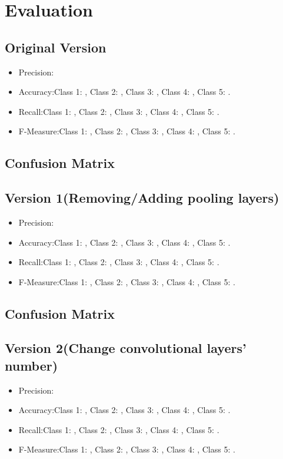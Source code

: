 \documentclass[stu, floatsintext, 10pt, donotrepeattitle, natbib]{apa7}
\begin{document}
\newpage


\section{Evaluation}
\subsection{Original Version}
\begin{itemize}
	\item Precision:
	\item Accuracy:Class 1: , Class 2: , Class 3: , Class 4: , Class 5: .
	\item Recall:Class 1: , Class 2: , Class 3: , Class 4: , Class 5: .
	\item F-Measure:Class 1: , Class 2: , Class 3: , Class 4: , Class 5: .
\end{itemize}
\subsection{Confusion Matrix}

\subsection{Version 1(Removing/Adding pooling layers)}
\begin{itemize}
	\item Precision:
	\item Accuracy:Class 1: , Class 2: , Class 3: , Class 4: , Class 5: .
	\item Recall:Class 1: , Class 2: , Class 3: , Class 4: , Class 5: .
	\item F-Measure:Class 1: , Class 2: , Class 3: , Class 4: , Class 5: .
\end{itemize}

\subsection{Confusion Matrix}
\subsection{Version 2(Change convolutional layers' number)}
\begin{itemize}
	\item Precision:
	\item Accuracy:Class 1: , Class 2: , Class 3: , Class 4: , Class 5: .
	\item Recall:Class 1: , Class 2: , Class 3: , Class 4: , Class 5: .
	\item F-Measure:Class 1: , Class 2: , Class 3: , Class 4: , Class 5: .
\end{itemize}
\end{document}
